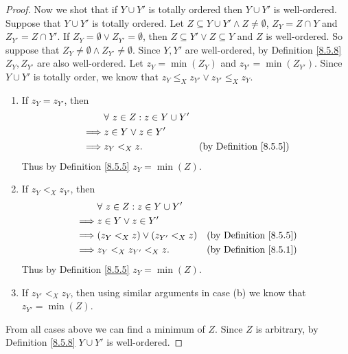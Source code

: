 \begin{proof}
    Now we shot that if \(Y \cup Y'\) is totally ordered then \(Y \cup Y'\) is well-ordered.
    Suppose that \(Y \cup Y'\) is totally ordered.
    Let \(Z \subseteq Y \cup Y' \land Z \neq \emptyset\), \(Z_Y = Z \cap Y\) and \(Z_{Y'} = Z \cap Y'\).
    If \(Z_Y = \emptyset \lor Z_{Y'} = \emptyset\), then \(Z \subseteq Y' \lor Z \subseteq Y\) and \(Z\) is well-ordered.
    So suppose that \(Z_Y \neq \emptyset \land Z_{Y'} \neq \emptyset\).
    Since \(Y, Y'\) are well-ordered, by Definition \ref{8.5.8} \(Z_Y, Z_{Y'}\) are also well-ordered.
    Let \(z_Y = \min(Z_Y)\) and \(z_{Y'} = \min(Z_{Y'})\).
    Since \(Y \cup Y'\) is totally order, we know that \(z_Y \leq_X z_{Y'} \lor z_{Y'} \leq_X z_Y\).
    \begin{enumerate}
        \item If \(z_Y = z_{Y'}\), then
              \begin{align*}
                           & \forall\ z \in Z : z \in Y \cup Y'                                      \\
                  \implies & z \in Y \lor z \in Y'                                                   \\
                  \implies & z_Y <_X z.                         & \text{(by Definition \ref{8.5.5})}
              \end{align*}
              Thus by Definition \ref{8.5.5} \(z_Y = \min(Z)\).
        \item If \(z_Y <_X z_{Y'}\), then
              \begin{align*}
                           & \forall\ z \in Z : z \in Y \cup Y'                                      \\
                  \implies & z \in Y \lor z \in Y'                                                   \\
                  \implies & (z_Y <_X z) \lor (z_{Y'} <_X z)    & \text{(by Definition \ref{8.5.5})} \\
                  \implies & z_Y <_X z_{Y'} <_X z.              & \text{(by Definition \ref{8.5.1})}
              \end{align*}
              Thus by Definition \ref{8.5.5} \(z_Y = \min(Z)\).
        \item If \(z_{Y'} <_X z_Y\), then using similar arguments in case (b) we know that \(z_{Y'} = \min(Z)\).
    \end{enumerate}
    From all cases above we can find a minimum of \(Z\).
    Since \(Z\) is arbitrary, by Definition \ref{8.5.8} \(Y \cup Y'\) is well-ordered.
\end{proof}

